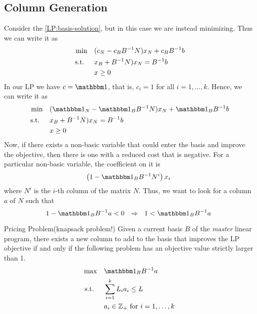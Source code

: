\documentclass[../open-optimization/open-optimization.tex]{subfiles}
\begin{document}
% 



\subsection{Column Generation}
Consider the \eqref{LP:basis-solution}, but in this case we are instead minimizing.  Thus we can write it as 
 \begin{equation}
 \label{LP:basis-solution2}
\begin{split}
\min \quad & (c_N  - c_B B^{-1} N) x_N + c_B B^{-1} b  \\
\text{ s.t. }  \quad &x_B +  B^{-1} N) x_N = B^{-1}b\\
& x \geq 0
\end{split}
\end{equation}
In our LP we have $c = \one$, that is, $c_i =1$ for all $i=1, \dots, k$.  Hence, we can write it as 
 \begin{equation}
 \label{LP:basis-solution3}
\begin{split}
\min \quad & (\one_N  - \one_B B^{-1} N) x_N + \one_B B^{-1} b  \\
\st  \quad &x_B +  B^{-1} N) x_N = B^{-1}b\\
& x \geq 0
\end{split}
\end{equation}
Now, if there exists a non-basic variable that could enter the basis and improve the objective, then there is one with a reduced cost that is negative.  For a particular non-basic variable, the coefficient on it is
\begin{equation}
\left( 1 -  \one_B B^{-1} N^i\right) x_i
\end{equation}
where $N^i$ is the $i$-th column of the matrix $N$.  Thus, we want to look for a column $a$ of $N$ such that 
\begin{equation}
1 -  \one_B B^{-1} a < 0 \ \  \Rightarrow \ \   1 < \one_B B^{-1} a
\end{equation}
\begin{general}{Pricing Problem}{(knapsack problem!)}
Given a current basis $B$ of the \emph{master} linear program, there exists a new column to add to the basis that improves the LP objective if and only if the following problem has an objective value strictly larger than 1.
\begin{equation}
\begin{split}
\max\quad  &\one_B B^{-1} a\\
\st \quad & \sum_{i=1}^k L_i a_i \leq L\\
& a_i \in \Z_+ \text{ for } i=1, \dots, k
\end{split}
\end{equation}
\end{general}
\end{document}
